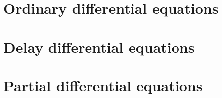\documentclass[12pt]{report}
\theoremstyle{plain}
\begin{document}
\part{Ordinary differential equations}





\part{Delay differential equations}



\part{Partial differential equations}


\appendix





\printindex
\end{document}
